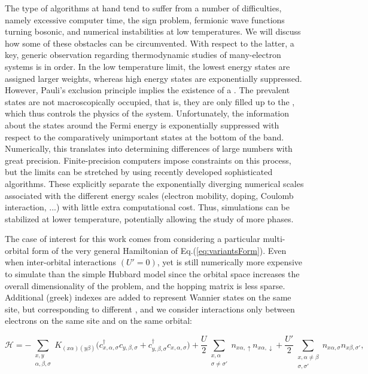 The type of algorithms at hand tend to suffer from a number of difficulties, namely excessive computer time, the sign problem, fermionic wave functions turning bosonic, and numerical instabilities at low temperatures.
We will discuss how some of these obstacles can be circumvented.
With respect to the latter, a key, generic observation regarding thermodynamic studies of many-electron systems is in order.
In the low temperature limit, the lowest energy states are assigned larger weights, whereas high energy states are exponentially suppressed.
However, Pauli's exclusion principle implies the existence of a .
The prevalent states are not macroscopically occupied, that is, they are only filled up to the , which thus controls the physics of the system.
Unfortunately, the information about the states around the Fermi energy is exponentially suppressed with respect to the comparatively unimportant states at the bottom of the band.
Numerically, this translates into determining differences of large numbers with great precision.
Finite-precision computers impose constraints on this process, but the limits can be stretched by using recently developed sophisticated algorithms.
These explicitly separate the exponentially diverging numerical scales associated with the different energy scales (electron mobility, doping, Coulomb interaction, ...) with little extra computational cost.
Thus, simulations can be stabilized at lower temperature, potentially allowing the study of more phases.

The case of interest for this work comes from considering a particular multi-orbital form of the very general Hamiltonian of Eq.(\ref{eq:variantsForm}).
Even when inter-orbital interactions $(U' = 0)$, yet is still numerically more expensive to simulate than the simple Hubbard model since the orbital space increases the overall dimensionality of the problem, and the hopping matrix is less sparse.
Additional (greek) indexes are added to represent Wannier states on the same site, but corresponding to different , and we consider interactions only between electrons on the same site and on the same orbital:

\begin{equation}\label{eq:variantTMD}
\mathcal{H} = - \sum_{\substack{x, y \\ \alpha, \beta, \sigma}} K_{(x\alpha)(y\beta )} \bigg( c_{x,\alpha, \sigma}^\dagger c_{y,\beta, \sigma} + c_{y,\beta , \sigma}^\dagger c_{x,\alpha, \sigma} \bigg) + \frac{U}{2} \sum_{\substack{x, \alpha \\ \sigma \neq \sigma'} } n_{x\alpha, \uparrow} n_{x\alpha, \downarrow} + \frac{U'}{2} \sum_{\substack{x, \alpha \neq \beta \\ \sigma, \sigma'}} n_{x\alpha, \sigma} n_{x\beta, \sigma'}  ,
\end{equation}

